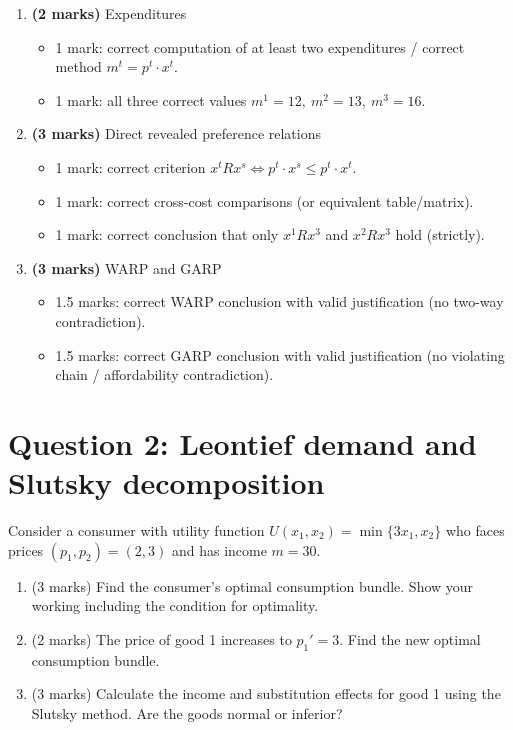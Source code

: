 \documentclass[12pt]{article}
\begin{document}
\begin{enumerate}[label=(\alph*)]
\item \textbf{(2 marks)} Expenditures
\begin{itemize}
\item 1 mark: correct computation of at least two expenditures / correct method \(m^t=p^t\cdot x^t\).
\item 1 mark: all three correct values \(m^1=12,\ m^2=13,\ m^3=16\).
\end{itemize}

\item \textbf{(3 marks)} Direct revealed preference relations
\begin{itemize}
\item 1 mark: correct criterion \(x^t R x^s \iff p^t\cdot x^s \le p^t\cdot x^t\).
\item 1 mark: correct cross-cost comparisons (or equivalent table/matrix).
\item 1 mark: correct conclusion that only \(x^1 R x^3\) and \(x^2 R x^3\) hold (strictly).
\end{itemize}

\item \textbf{(3 marks)} WARP and GARP
\begin{itemize}
\item 1.5 marks: correct WARP conclusion with valid justification (no two-way contradiction).
\item 1.5 marks: correct GARP conclusion with valid justification (no violating chain / affordability contradiction).
\end{itemize}
\end{enumerate}





\newpage
\section*{Question 2: Leontief demand and Slutsky decomposition}
Consider a consumer with utility function $U(x_1, x_2) = \min\{3x_1, x_2\}$ who faces prices $(p_1, p_2) = (2, 3)$ and has income $m = 30$.

\begin{enumerate}[label=(\alph*)]
\item (3 marks) Find the consumer's optimal consumption bundle. Show your working including the condition for optimality.
\item (2 marks) The price of good 1 increases to $p_1' = 3$. Find the new optimal consumption bundle.
\item (3 marks) Calculate the income and substitution effects for good 1 using the Slutsky method. Are the goods normal or inferior?
\end{enumerate}
\end{document}
